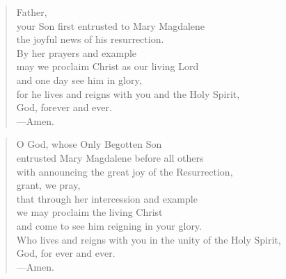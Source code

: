 \prayer

\setlength{\vleftmargin}{\prayerleftmargini}

\begin{verse}
Father,\\
your Son first entrusted to Mary Magdalene\\
the joyful news of his resurrection.\\
By her prayers and example\\
may we proclaim Christ as our living Lord\\
and one day see him in glory,\\
for he lives and reigns with you and the Holy Spirit,\\
God, forever and ever.\\
{\color{red}---\thinspace}Amen.
\end{verse}


\begin{verse}
O God, whose Only Begotten Son\\
entrusted Mary Magdalene before all others\\
with announcing the great joy of the Resurrection,\\
grant, we pray,\\
that through her intercession and example\\
we may proclaim the living Christ\\
and come to see him reigning in your glory.\\
Who lives and reigns with you in the unity of the Holy Spirit,\\
God, for ever and ever.\\
{\color{red}---\thinspace}Amen.
\end{verse}

\setlength{\vleftmargin}{\defleftmargini}